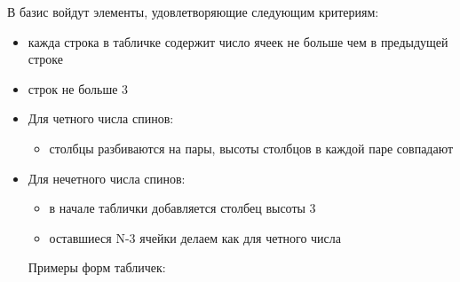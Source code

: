 \documentclass[]{article}
\renewcommand{\[}{\begin{equation}}
\renewcommand{\]}{\end{equation}}
\begin{document}
В базис войдут элементы, удовлетворяющие следующим критериям:
\begin{itemize}
	\item кажда строка в табличке содержит число ячеек не больше чем в предыдущей строке
	\item строк не больше 3
	\item Для четного числа спинов:
	\begin{itemize}
		\item столбцы разбиваются на пары, высоты столбцов в каждой паре совпадают
	\end{itemize}
	\item Для нечетного числа спинов:
	\begin{itemize}
		\item в начале таблички добавляется столбец высоты 3
		\item оставшиеся N-3 ячейки делаем как для четного числа
	\end{itemize}
	Примеры форм табличек:
	

\end{itemize}
\end{document}
